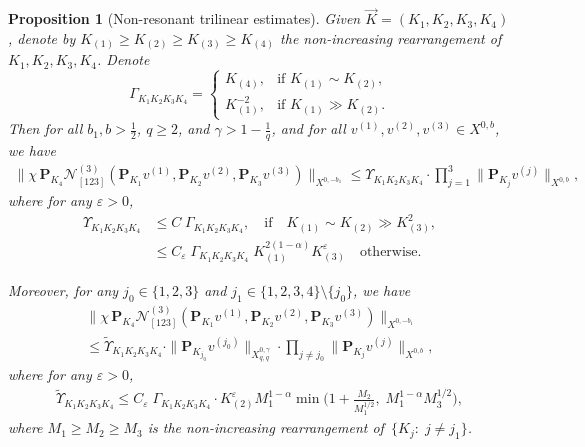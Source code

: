 \documentclass[11pt,reqno,english]{amsart}
\numberwithin{equation}{section}
\theoremstyle{plain}
\newtheorem{proposition}[theorem]{Proposition}
\theoremstyle{definition}
\theoremstyle{remark}
\renewcommand{\epsilon}{\varepsilon}
\begin{document}
\begin{proposition}[Non-resonant trilinear estimates]\label{prop:non-resonant}
	Given $\vec{K}=(K_{1},K_{2},K_{3},K_4)$, denote by
	$K_{(1)}\geq K_{(2)}\geq K_{(3)}\geq K_{(4)}$ the non-increasing rearrangement of~$K_1,K_2,K_3,K_4$.
	Denote
	\[
	\Gamma_{K_1K_2K_3K_4}=
	\begin{cases}
		K_{(4)},& \text{if } K_{(1)}\sim K_{(2)},\\
		K_{(1)}^{-2},& \text{if } K_{(1)}\gg K_{(2)}.
	\end{cases}
	\]
	Then for all $b_{1},b>\tfrac12$, $q\ge2$, and $\gamma>1-\tfrac1q$,
	and for all
	$v^{(1)},v^{(2)},v^{(3)}\in X^{0,b}$, we have
	\begin{align*}
		\Big\|
		\chi\,\mathbf{P}_{K_{4}}
		\mathcal{N}_{[123]}^{(3)}
		(\mathbf{P}_{K_{1}}v^{(1)},\mathbf{P}_{K_{2}}v^{(2)},\mathbf{P}_{K_{3}}v^{(3)})
		\Big\|_{X^{0,-b_{1}}} \leq \Upsilon_{K_1K_2K_3K_4}\cdot \prod_{j=1}^3\|\mathbf{P}_{K_j}v^{(j)}\|_{X^{0,b}},
	\end{align*}
	where for any $\epsilon>0$,
	\begin{align}
		\Upsilon_{K_1K_2K_3K_4}&\leq C\;\Gamma_{K_1K_2K_3K_4},\quad \text{if}\quad K_{(1)}\sim K_{(2)}\gg K_{(3)}^2, \label{eq:tri1'}
		\\
		\label{eq:tri1}
		&\leq C_{\epsilon}\;\Gamma_{K_1K_2K_3K_4}\; K_{(1)}^{2(1-\alpha)}K_{(3)}^{\epsilon}\quad \text{otherwise}.
	\end{align}

	Moreover, for any $j_0\in\{1,2,3\}$ and $j_1\in\{1,2,3,4\}\setminus\{j_0\}$, we have
	\begin{multline*}
		\Big\|
		\chi\,\mathbf{P}_{K_{4}}
		\mathcal{N}_{[123]}^{(3)}
		(\mathbf{P}_{K_{1}}v^{(1)},\mathbf{P}_{K_{2}}v^{(2)},\mathbf{P}_{K_{3}}v^{(3)})
		\Big\|_{X^{0,-b_{1}}} \\
		\leq \widetilde{\Upsilon}_{K_1K_2K_3K_4}\cdot \|\mathbf{P}_{K_{j_0}}v^{(j_0)}\|_{X_{q,q}^{0,\gamma}}\cdot \prod_{j\neq j_0}\|\mathbf{P}_{K_j}v^{(j)}\|_{X^{0,b}},
	\end{multline*}
	where for any $\epsilon>0$,
	\begin{align}\label{eq:tri2}
		\widetilde{\Upsilon}_{K_1K_2K_3K_4}\leq C_{\epsilon}\;\Gamma_{K_1K_2K_3K_4}\cdot K_{(2)}^{\epsilon}M_1^{1-\alpha}\min\Big(1+\frac{M_2}{M_1^{1/2}},\; M_1^{1-\alpha}M_3^{1/2}\Big),
	\end{align}
	where $M_1\geq M_2\geq M_3$ is the non-increasing rearrangement of~$\{K_j:\; j\neq j_1\}$.
\end{proposition}
\end{document}
